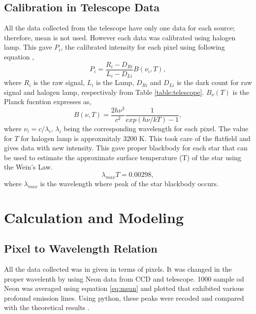\documentclass[a4paper,12pt]{article}
\begin{document}
\subsection{Calibration in Telescope Data} 
\label{sec:noise_tele}
All the data collected from the telescope have only one data for each source; therefore, mean is not used. However each data was calibrated using halogen lamp. This gave $P_i$, the calibrated intensity for each pixel using following equation \cite{instructions}, 
\begin{equation}
\label{eq:blackbody}
P_i = {\frac{R_i-D_{Ri}}{L_i-D_{Li}}B(\nu_i,T)},
\end{equation}
where $R_i$ is the raw signal, $L_i$ is the Lamp, $D_{Ri}$ and $D_{Li}$ is the dark count for raw signal and halogen lamp, respectivaly from Table \ref{table:telescope}. $B_{\nu}(T)$ is the Planck fucntion expresses as,   
\begin{equation}
\label{eq:planck}
B(\nu,T) = {\frac{2h\nu^3}{c^2}\frac{1}{exp(h\nu/kT)-1}},
\end{equation}
where $\nu_i=c/\lambda_i$, $\lambda_i$ being the corresponding wavelength for each pixel. The value for $T$ for halogen lamp is approxmitaly 3200 K. This took care of the flatfield and gives data with new intensity. This gave proper blackbody for each star that can be used to estimate the approximate surface temperature (T) of the star using the Wein's Law.
\begin{equation}
\label{eq:wein}
\lambda_{max} T = 0.00298,
\end{equation}
where $\lambda_{max}$ is the wavelength where peak of the star blackbody occurs. 

\section{Calculation and Modeling}
\label{sec:calc}

\subsection{Pixel to Wavelength Relation} 
\label{sec:p-w}
All the data collected was in given in terms of pixels. It was changed in the proper wavelenth by using Neon data from CCD and telescope. 1000 sample od Neon was averaged using equation \ref{eq:mean} and plotted that exhibited various profound emission lines. Using python, these peaks were recoded and compared with the theoretical results \cite{Neon}.
\end{document}
